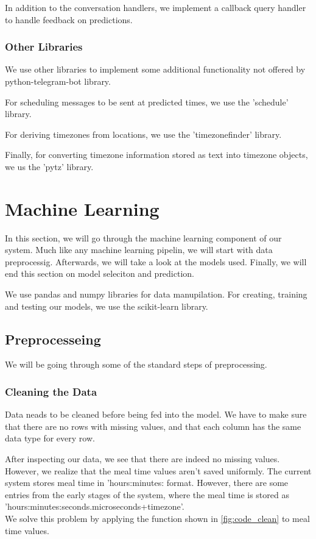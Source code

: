 In addition to the conversation handlers, we implement a callback query handler to handle feedback on predictions.

\subsubsection{Other Libraries}
We use other libraries to implement some additional functionality not offered by python-telegram-bot library.

For scheduling messages to be sent at predicted times, we use the 'schedule' library.

For deriving timezones from locations, we use the 'timezonefinder' library.

Finally, for converting timezone information stored as text into timezone objects, we us the 'pytz' library.

\section{Machine Learning}
In this section, we will go through the machine learning component of our system.
Much like any machine learning pipelin, we will start with data preprocessig.
Afterwards, we will take a look at the models used.
Finally, we will end this section on model seleciton and prediction.

We use pandas \parencite{pandas} and numpy \parencite{numpy} libraries for data manupilation.
For creating, training and testing our models, we use the scikit-learn \parencite{scikit-learn} library.
\subsection{Preprocesseing}
We will be going through some of the standard steps of preprocessing.
\subsubsection{Cleaning the Data}
Data neads to be cleaned before being fed into the model.
We have to make sure that there are no rows with missing values,
and that each column has the same data type for every row.

After inspecting our data, we see that there are indeed no missing values.
However, we realize that the meal time values aren't saved uniformly.
The current system stores meal time in 'hours:minutes: format.
However, there are some entries from the early stages of the system, 
where the meal time is stored as\\
'hours:minutes:seconds.microseconds+timezone'.\\
We solve this problem by applying the function shown in \autoref{fig:code_clean} to meal time values.

